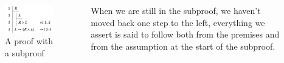 \documentclass[
  ignorenonframetext,
]{beamer}
\renewcommand{\,}{\text{, }}
\begin{document}
\begin{frame}
\begin{columns}[c]
\begin{column}{0.48\textwidth}
\begin{figure}
\centering
\includegraphics{4_7c.png}
\caption{A proof with a subproof}
\end{figure}
\end{column}

\begin{column}{0.48\textwidth}
When we are still in the subproof, we haven't moved back one step to the
left, everything we assert is said to follow both from the premises and
from the assumption at the start of the subproof.
\end{column}
\end{columns}
\end{frame}
\end{document}
